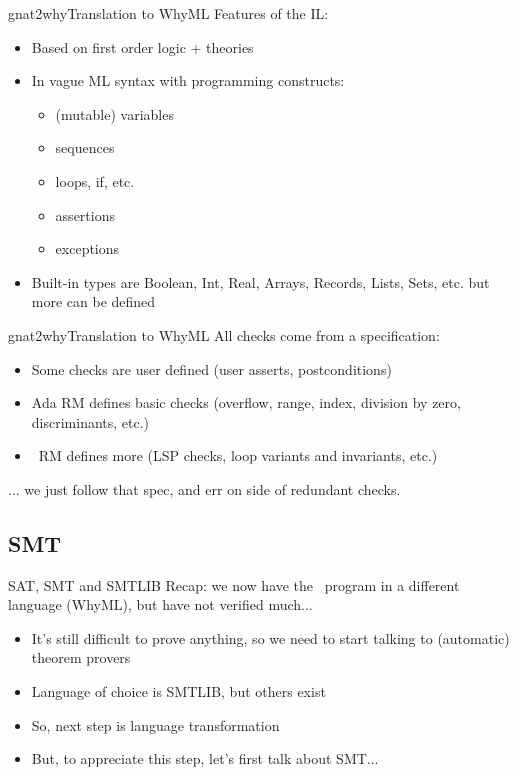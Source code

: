 \documentclass{beamer}
\begin{document}
\begin{frame}{gnat2why}{Translation to WhyML}
  Features of the IL:
  \begin{itemize}
  \item Based on first order logic + theories
  \item In vague ML syntax with programming constructs:
    \begin{itemize}
    \item (mutable) variables
    \item sequences
    \item loops, if, etc.
    \item assertions
    \item exceptions
    \end{itemize}
  \item Built-in types are Boolean, Int, Real, Arrays, Records, Lists,
    Sets, etc. but more can be defined
  \end{itemize}
\end{frame}

\begin{frame}{gnat2why}{Translation to WhyML}
  All checks come from a specification:
  \begin{itemize}
  \item Some checks are user defined (user asserts, postconditions)
  \item Ada RM defines basic checks (overflow, range, index, division
    by zero, discriminants, etc.)
  \item \spark\ RM defines more (LSP checks, loop variants and
    invariants, etc.)
  \end{itemize}
  ... we just follow that spec, and err on side of redundant checks.
\end{frame}


\subsection{SMT}
\begin{frame}{SAT, SMT and SMTLIB}
  Recap: we now have the \spark\ program in a different language (WhyML),
  but have not verified much...
  \begin{itemize}
  \item It's still difficult to prove anything, so we need to start talking
    to (automatic) theorem provers
  \item Language of choice is SMTLIB, but others exist
  \item So, next step is  language transformation
  \item But, to appreciate this step, let's first talk about SMT...
  \end{itemize}
\end{frame}
\end{document}
